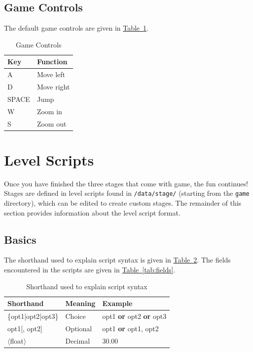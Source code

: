 \documentclass[12pt, titlepage]{article}
\begin{document}
\newpage
\subsection{Game Controls}
The default game controls are given in \hyperref[tab:ctrl]{Table~\ref*{tab:ctrl}}.


\begin{table}[H]
\caption{Game Controls} \label{tab:ctrl}
\centering
\begin{tabularx}{0.65\textwidth}{p{2.5cm}X}
\toprule {\bf Key} & {\bf Function}\\
\midrule
A & Move left\\
D & Move right\\
SPACE & Jump\\
W & Zoom in\\
S & Zoom out\\
\bottomrule
\end{tabularx}
\end{table}

\FloatBarrier

\section{Level Scripts}
\label{sec:edit}
Once you have finished the three stages that come with game, the fun continues!  Stages are defined in level scripts found in \texttt{/data/stage/} (starting from the \texttt{game} directory), which can be edited to create custom stages.  The remainder of this section provides information about the level script format.

\subsection{Basics}
The shorthand used to explain script syntax is given in \hyperref[tab:notation]{Table~\ref*{tab:notation}}.  The fields encountered in the scripts are given in \hyperref[tab:fields]{Table~\ref*{tab:fields}}.

\begin{table}[h]
\caption{Shorthand used to explain script syntax} \label{tab:notation}
\centering
\begin{tabularx}{\textwidth}{p{5cm}p{3cm}X}
\toprule {\bf Shorthand} & {\bf Meaning} & {\bf Example}\\
\midrule
\{opt1|opt2|opt3\} & Choice & opt1 {\bf or} opt2 {\bf or} opt3\\
opt1[, opt2] & Optional & opt1 {\bf or} opt1, opt2\\
$\langle$float$\rangle$ & Decimal & 30.00\\
\bottomrule
\end{tabularx}
\end{table}
\end{document}
